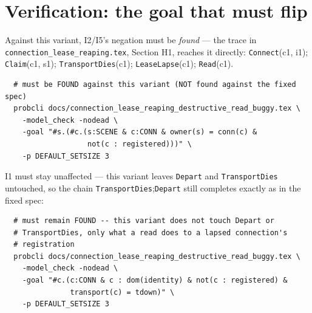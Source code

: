 \documentclass[a4paper,10pt,fleqn]{article}
\begin{document}
\section{Verification: the goal that must flip}

Against this variant, I2/I5's negation must be \emph{found} --- the trace
in \texttt{connection\_lease\_reaping.tex}, Section H1, reaches it
directly: \texttt{Connect}(c1, i1); \texttt{Claim}(c1, s1);
\texttt{TransportDies}(c1); \texttt{LeaseLapse}(c1); \texttt{Read}(c1).

\begin{verbatim}
  # must be FOUND against this variant (NOT found against the fixed spec)
  probcli docs/connection_lease_reaping_destructive_read_buggy.tex \
    -model_check -nodead \
    -goal "#s.(#c.(s:SCENE & c:CONN & owner(s) = conn(c) &
                   not(c : registered)))" \
    -p DEFAULT_SETSIZE 3
\end{verbatim}

I1 must stay unaffected --- this variant leaves \texttt{Depart} and
\texttt{TransportDies} untouched, so the chain
\texttt{TransportDies};\texttt{Depart} still completes exactly as in the
fixed spec:

\begin{verbatim}
  # must remain FOUND -- this variant does not touch Depart or
  # TransportDies, only what a read does to a lapsed connection's
  # registration
  probcli docs/connection_lease_reaping_destructive_read_buggy.tex \
    -model_check -nodead \
    -goal "#c.(c:CONN & c : dom(identity) & not(c : registered) &
               transport(c) = tdown)" \
    -p DEFAULT_SETSIZE 3
\end{verbatim}
\end{document}
